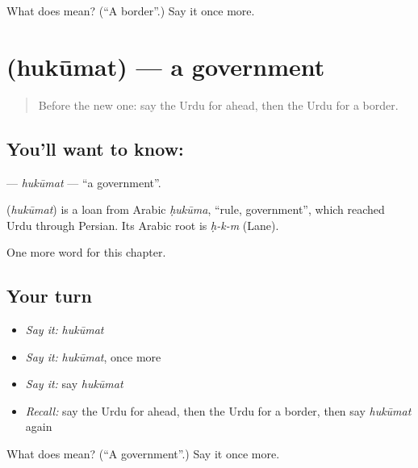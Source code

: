 \begin{tcolorbox}[breakable,colback=teal!4,colframe=teal!35!black,title={Before you move on}]
What does  mean? (\textquotedblleft{}A border\textquotedblright{}.) Say it once more.
\end{tcolorbox}
\section[\texorpdfstring{\ur{حکومت} (hukūmat)}{حکومت (hukūmat)}]{ (hukūmat) — a government}

\label{lesson:UR-C246-hukumat}



\begin{quote}
Before the new one: say the Urdu for ahead, then the Urdu for a border.
\end{quote}

\subsection*{You'll want to know: }
\textbf{} — \emph{hukūmat} — \textquotedblleft{}a government\textquotedblright{}.

\begin{cousinweb}
\textbf{} (\emph{hukūmat}) is a loan from Arabic \emph{ḥukūma}, \textquotedblleft{}rule, government\textquotedblright{}, which reached Urdu through Persian. Its Arabic root is \emph{ḥ-k-m} (Lane).
\end{cousinweb}

\begin{grammarlens}[title={What you've built}]
One more word for this chapter.
\end{grammarlens}

\subsection*{Your turn}
\begin{itemize}
\raggedright
  \item \emph{Say it:} \emph{hukūmat}
  \item \emph{Say it:} \emph{hukūmat}, once more
  \item \emph{Say it:} say \emph{hukūmat}
  \item \emph{Recall:} say the Urdu for ahead, then the Urdu for a border, then say \emph{hukūmat} again
\end{itemize}

\begin{tcolorbox}[breakable,colback=teal!4,colframe=teal!35!black,title={Before you move on}]
What does  mean? (\textquotedblleft{}A government\textquotedblright{}.) Say it once more.
\end{tcolorbox}
